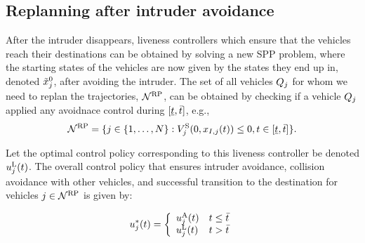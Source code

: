 \subsection{Replanning after intruder avoidance} \label{sec:replan}
After the intruder disappears, liveness controllers which ensure that the vehicles reach their destinations can be obtained by solving a new SPP problem, where the starting states of the vehicles are now given by the states they end up in, denoted $\tilde{x}_j^0$, after avoiding the intruder. The set of all vehicles $Q_j$ for whom we need to replan the trajectories, $\mathcal{N}^\text{RP}$, can be obtained by checking if a vehicle $Q_j$ applied any avoidnace control during $[\underline{t}, \bar{t}]$, e.g.,
\begin{equation} \label{eq:RVS}
\rvs = \{j \in \{1, \ldots, \N \}: \valfunc^{\text{S}}_{j}(0, \state_{\intr, j}(t)) \leq 0, t \in [\tsa, \tea] \}. 
\end{equation}  

Let the optimal control policy corresponding to this liveness controller be denoted ${u^{\text{L}}_{j}}(t)$. The overall control policy that ensures intruder avoidance, collision avoidance with other vehicles, and successful transition to the destination for vehicles $j \in \mathcal{N}^\text{RP}$ is given by:

\begin{equation*}
u_j^*(t) = 
\left \{ 
\begin{array}{ll}
{u^{\text{A}}_{j}}(t) & t \leq \bar{t}\\
{u^{\text{L}}_{j}}(t) & t > \bar{t}
\end{array}
\right.
\end{equation*}


